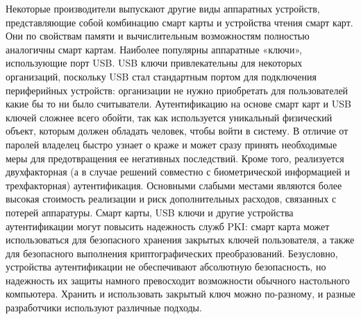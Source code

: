 Некоторые производители выпускают другие виды аппаратных устройств,
представляющие собой комбинацию смарт карты и устройства чтения смарт карт. Они
по свойствам памяти и вычислительным возможностям полностью аналогичны смарт
картам. Наиболее популярны аппаратные «ключи», использующие порт USB. USB ключи
привлекательны для некоторых организаций, поскольку USB стал стандартным портом
для подключения периферийных устройств: организации не нужно приобретать для
пользователей какие бы то ни было считыватели. Аутентификацию на основе смарт
карт и USB ключей сложнее всего обойти, так как используется уникальный
физический объект, которым должен обладать человек, чтобы войти в систему. В
отличие от паролей владелец быстро узнает о краже и может сразу принять
необходимые меры для предотвращения ее негативных последствий. Кроме того,
реализуется двухфакторная (а в случае решений совместно с биометрической
информацией и трехфакторная) аутентификация. Основными слабыми местами являются
более высокая стоимость реализации и риск дополнительных расходов, связанных с
потерей аппаратуры. Смарт карты, USB ключи и другие устройства аутентификации
могут повысить надежность служб PKI: смарт карта может использоваться для
безопасного хранения закрытых ключей пользователя, а также для безопасного
выполнения криптографических преобразований. Безусловно, устройства
аутентификации не обеспечивают абсолютную безопасность, но надежность их защиты
намного превосходит возможности обычного настольного компьютера. Хранить и
использовать закрытый ключ можно по-разному, и разные разработчики используют
различные подходы.

